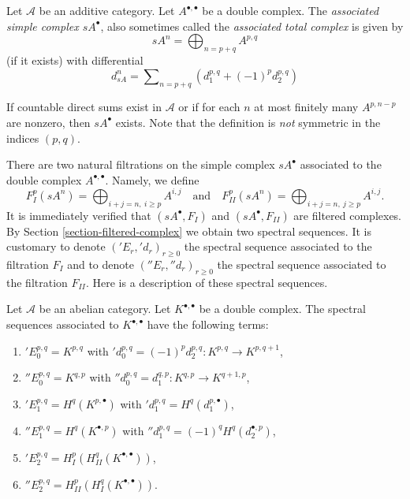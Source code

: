 \begin{definition}
\label{definition-associated-simple-complex}
Let $\mathcal{A}$ be an additive category.
Let $A^{\bullet, \bullet}$ be a double complex.
The {\it associated simple complex $sA^\bullet$}, also
sometimes called the {\it associated total complex} is
given by
$$
sA^n = \bigoplus\nolimits_{n = p + q} A^{p, q}
$$
(if it exists) with differential
$$
d_{sA}^n = \sum\nolimits_{n = p + q} (d_1^{p, q} + (-1)^p d_2^{p, q})
$$
\end{definition}

\noindent
If countable direct sums exist in $\mathcal{A}$ or if for each $n$ at most
finitely many $A^{p, n - p}$ are nonzero, then $sA^\bullet$ exists. Note that
the definition is {\it not} symmetric in the indices $(p, q)$.

\medskip\noindent
There are two natural filtrations on the simple complex $sA^\bullet$
associated to the double complex $A^{\bullet, \bullet}$. Namely, we
define
$$
F_I^p(sA^n) = \bigoplus\nolimits_{i + j = n,\ i \geq p} A^{i, j}
\quad
\text{and}
\quad
F_{II}^p(sA^n) = \bigoplus\nolimits_{i + j = n,\ j \geq p} A^{i, j}.
$$
It is immediately verified that $(sA^\bullet, F_I)$ and
$(sA^\bullet, F_{II})$ are filtered complexes.
By Section \ref{section-filtered-complex}
we obtain two spectral sequences. It is customary to
denote $({}'E_r, {}'d_r)_{r \geq 0}$ the spectral sequence associated
to the filtration $F_I$ and to denote $({}''E_r, {}''d_r)_{r \geq 0}$
the spectral sequence associated to the filtration $F_{II}$.
Here is a description of these spectral sequences.

\begin{lemma}
\label{lemma-ss-double-complex}
Let $\mathcal{A}$ be an abelian category.
Let $K^{\bullet, \bullet}$ be a double complex.
The spectral sequences associated to $K^{\bullet, \bullet}$
have the following terms:
\begin{enumerate}
\item ${}'E_0^{p, q} = K^{p, q}$ with
${}'d_0^{p, q} = (-1)^p d_2^{p, q} : K^{p, q} \to K^{p, q + 1}$,
\item ${}''E_0^{p, q} = K^{q, p}$ with
${}''d_0^{p, q} = d_1^{q, p} : K^{q, p} \to K^{q + 1, p}$,
\item ${}'E_1^{p, q} = H^q(K^{p, \bullet})$ with
${}'d_1^{p, q} = H^q(d_1^{p, \bullet})$,
\item ${}''E_1^{p, q} = H^q(K^{\bullet, p})$ with
${}''d_1^{p, q} = (-1)^q H^q(d_2^{\bullet, p})$,
\item ${}'E_2^{p, q} = H^p_{I}(H^q_{II}(K^{\bullet, \bullet}))$,
\item ${}''E_2^{p, q} = H^p_{II}(H^q_{I}(K^{\bullet, \bullet}))$.
\end{enumerate}
\end{lemma}

